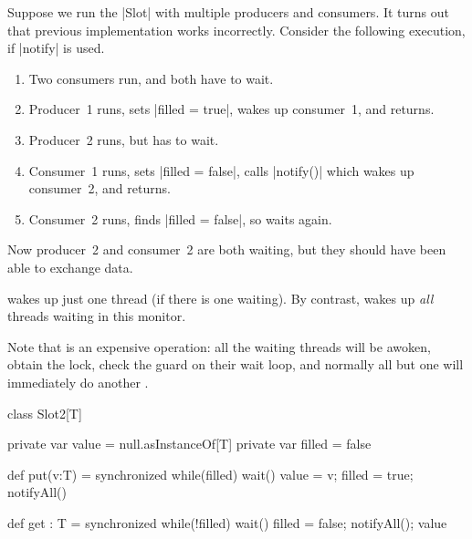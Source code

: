 \begin{slide}

Suppose we run the |Slot| with multiple producers and consumers.  It turns out
that previous implementation works incorrectly.
%
Consider the following execution, if |notify| is used.
%
\begin{enumerate}
\item Two consumers run, and both have to wait.

\item Producer~1 runs, sets |filled = true|, wakes up consumer~1, and returns.

\item Producer~2 runs, but has to wait.

\item Consumer~1 runs, sets |filled = false|, calls |notify()| which wakes up
consumer~2, and returns.

\item Consumer~2 runs, finds |filled = false|, so waits again. 
\end{enumerate}
%
Now producer~2 and consumer~2 are both waiting, but they should have been able
to exchange data. 

\end{slide}


\begin{slide}


 wakes up just one thread (if there is one waiting).  By
contrast,  wakes up \emph{all} threads waiting in this
monitor. 

Note that  is an expensive operation: all the waiting
threads will be awoken, obtain the lock, check the guard on their wait loop,
and normally all but one will immediately do another .
\end{slide}


\begin{slide}

\begin{scala}
class Slot2[T]{
  private var value = null.asInstanceOf[T]
  private var filled = false

  def put(v:T) = synchronized{
    while(filled) wait()
    value = v; filled = true; notifyAll()
  }

  def get : T = synchronized{
    while(!filled) wait()
    filled = false; notifyAll(); value
  }
}
\end{scala}
%
\end{slide}


